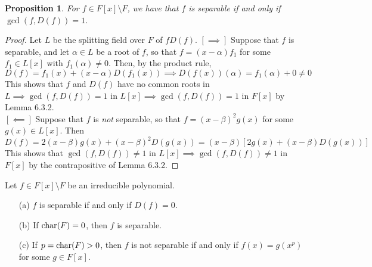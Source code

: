 \documentclass[11pt]{book}
\newcounter{counter}
\newtheorem{proposition}[counter]{Proposition}   \newtheorem{problem}[counter]{Problem}   \newtheorem*{proposition*}{Proposition}   \newtheorem*{lemma*}{Lemma}
\theoremstyle{definition}   \newtheorem{defn}[counter]{Definition} %
\newcommand{\bs}{\setminus}   \newcommand{\A}{\mathcal{A}}   \newcommand{\sy}{\textnormal{Syl}}   \newcommand{\size}[1]{\left| #1 \right|}
\newcommand{\vs}{\vspace{8pt}}
\numberwithin{counter}{chapter}
\begin{document}
\vs

\begin{proposition}
For $f \in F[x] \bs F$, we have that $f$ is separable if and only if $\gcd(f,D(f)) = 1$. 
\end{proposition}

\begin{proof}
Let $L$ be the splitting field over $F$ of $f D(f)$. $[\implies]$ Suppose that $f$ is separable, and let $\alpha \in L$ be a root of $f$, so that $f = (x-\alpha) f_1$ for some $f_1 \in L[x]$ with $f_1(\alpha) \ne 0$. Then, by the product rule,
	\[D(f) = f_1(x) + (x-\alpha) D(f_1(x)) \implies D(f(x))(\alpha) = f_1(\alpha) + 0 \ne 0 \]
This shows that $f$ and $D(f)$ have no common roots in $L \implies \gcd(f,D(f)) = 1$ in $L[x] \implies \gcd(f,D(f)) = 1$ in $F[x]$ by Lemma 6.3.2. \\

$[\impliedby]$ Suppose that $f$ is \emph{not} separable, so that $f = (x-\beta)^2 g(x)$ for some $g(x) \in L[x]$. Then 
	\[D(f) = 2(x-\beta) g(x) + (x-\beta)^2 D(g(x)) = (x-\beta)[2g(x) + (x-\beta) D(g(x))] \]
This shows that $\gcd(f,D(f)) \ne 1$ in $L[x] \implies \gcd(f,D(f)) \ne 1$ in $F[x]$ by the contrapositive of Lemma 6.3.2. 
\end{proof}

\vs

\begin{corollary}
Let $f \in F[x] \bs F$ be an irreducible polynomial.
\begin{enumerate}
\item[(a)] $f$ is separable if and only if $D(f) = 0$. 
\item[(b)] If $\textnormal{char}(F) = 0$, then $f$ is separable. 
\item[(c)] If $p = \textnormal{char}(F) > 0$, then $f$ is not separable if and only if $f(x) = g(x^p)$ for some $g \in F[x]$. 
\end{enumerate}
\end{corollary}
\end{document}

